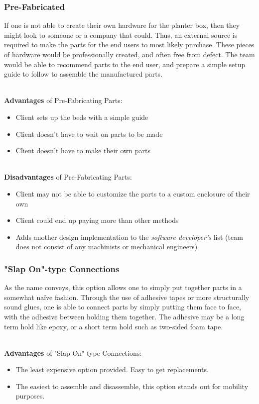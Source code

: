 \documentclass[onecolumn, draftclsnofoot,10pt, compsoc]{IEEEtran}
\begin{document}
		\subsubsection{Pre-Fabricated}
		If one is not able to create their own hardware for the planter box, then they might look to someone or a company that could.  Thus, an external source is
		required to make the parts for the end users to most likely purchase.  These pieces of hardware would be professionally created, and often free from
		defect.  The team would be able to recommend parts to the end user, and prepare a simple setup guide to follow to assemble the manufactured parts.

		\noindent \\ \textbf{Advantages} of Pre-Fabricating Parts:
		\begin{itemize}
			\item Client sets up the beds with a simple guide
			\item Client doesn't have to wait on parts to be made
			\item Client doesn't have to make their own parts
		\end{itemize}

		\noindent \\ \textbf{Disadvantages} of Pre-Fabricating Parts:
		\begin{itemize}
			\item Client may not be able to customize the parts to a custom enclosure of their own
			\item Client could end up paying more than other methods
			\item Adds another design implementation to the \textit{software developer's} list (team does not consist of any machinists or mechanical engineers)
		\end{itemize}


		\subsubsection{"Slap On"-type Connections}
		As the name conveys, this option allows one to simply put together parts in a somewhat naïve fashion.  Through the use of adhesive tapes or more structurally sound glues,
		one is able to connect parts by simply putting them face to face, with the adhesive between holding them together.  The adhesive may be a long term hold like epoxy, or a
		short term hold such as two-sided foam tape.

		\noindent \\ \textbf{Advantages} of "Slap On"-type Connections:
		\begin{itemize}
			\item The least expensive option provided.  Easy to get replacements.
			\item The easiest to assemble and disassemble, this option stands out for mobility purposes.
		\end{itemize}
\end{document}
